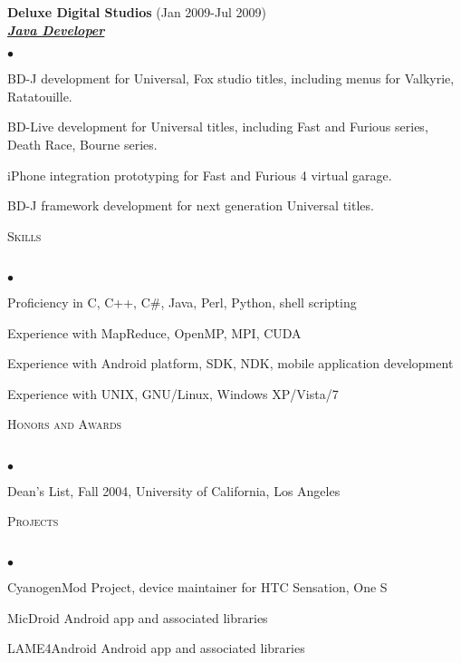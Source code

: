 \documentclass{article}
\newcommand{\lineunder}{\vspace*{-8pt} \\ \hspace*{-18pt} \hrulefill \\}
\newcommand{\header}[1]{{\hspace*{-15pt}\vspace*{6pt} \textsc{#1}} \vspace*{-6pt} \lineunder}
\newcommand{\employer}[3]{{ \textbf{#1} (#2)\\ \underline{\textbf{\emph{#3}}}\\  }}
\newenvironment{achievements}{\begin{list}{$\bullet$}{\topsep 0pt \itemsep -2pt}}{\vspace*{4pt}\end{list}}
\begin{document}
\employer{Deluxe Digital Studios}{Jan 2009-Jul 2009}{Java Developer}
  \begin{achievements}
    \item BD-J development for Universal, Fox studio titles, including menus for Valkyrie, Ratatouille.
    \item BD-Live development for Universal titles, including Fast and Furious series, Death Race, Bourne series.
    \item iPhone integration prototyping for Fast and Furious 4 virtual garage.
    \item BD-J framework development for next generation Universal titles.
  \end{achievements}

\header{Skills}
  \begin{achievements}
    \item Proficiency in C, C++, C\#, Java, Perl, Python, shell scripting
    \item Experience with MapReduce, OpenMP, MPI, CUDA
    \item Experience with Android platform, SDK, NDK, mobile application development
    \item Experience with UNIX, GNU/Linux, Windows XP/Vista/7
  \end{achievements}

\header{Honors and Awards}
  \begin{achievements}
    \item Dean's List, Fall 2004, University of California, Los Angeles
  \end{achievements}

\header{Projects}
  \begin{achievements}
    \item CyanogenMod Project, device maintainer for HTC Sensation, One S
    \item MicDroid Android app and associated libraries
    \item LAME4Android Android app and associated libraries
  \end{achievements}
\end{document}
